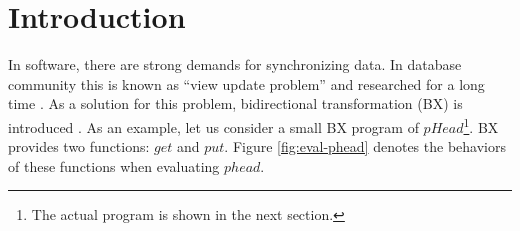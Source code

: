 \section{Introduction}



In software, there are strong demands for synchronizing data. In database community this is known as ``view update problem'' and researched for a long time \cite{viewupdate}.
As a solution for this problem, bidirectional transformation (BX) is introduced \cite{}. As an example, let us consider a small BX program of $pHead$\footnote{The actual program is shown in the next section.}. BX provides two functions: $get$ and $put$. Figure \ref{fig:eval-phead} denotes the behaviors of these functions when evaluating $phead$.

